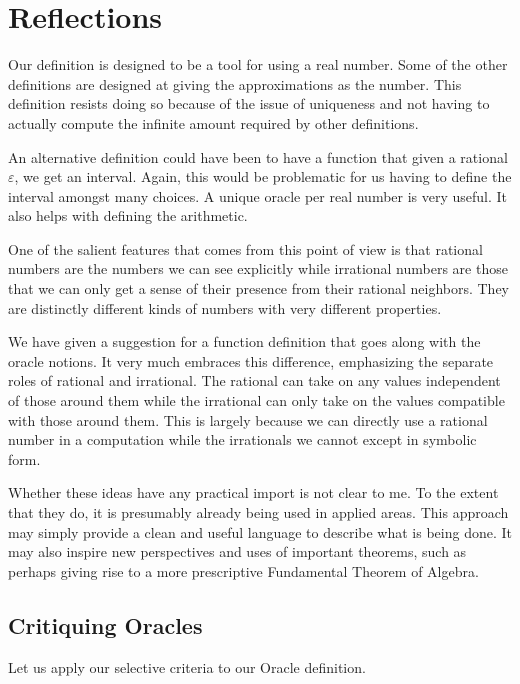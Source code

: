 \documentclass[12pt]{article}
\begin{document}
\section{Reflections}



Our definition is designed to be a tool for using a real number. Some of the other definitions are designed at giving the approximations as the number. This definition resists doing so because of the issue of uniqueness and not having to actually compute the infinite amount required by other definitions. 

An alternative definition could have been to have a function that given a rational $\varepsilon$, we get an interval. Again, this would be problematic for us having to define the interval amongst many choices. A unique oracle per real number is very useful. It also helps with defining the arithmetic. 

One of the salient features that comes from this point of view is that rational numbers are the numbers we can see explicitly while irrational numbers are those that we can only get a sense of their presence from their rational neighbors. They are distinctly different kinds of numbers with very different properties. 

We have given a suggestion for a function definition that goes along with the oracle notions. It very much embraces this difference, emphasizing the separate roles of rational and irrational. The rational can take on any values independent of those around them while the irrational can only take on the values compatible with those around them. This is largely because we can directly use a rational number in a computation while the irrationals we cannot except in symbolic form. 

Whether these ideas have any practical import is not clear to me. To the extent that they do, it is presumably already being used in applied areas. This approach may simply provide a clean and useful language to describe what is being done. It may also inspire new perspectives and uses of important theorems, such as perhaps giving rise to a more prescriptive Fundamental Theorem of Algebra. 

\subsection{Critiquing Oracles}

Let us apply our selective criteria to our Oracle definition. 
\end{document}
